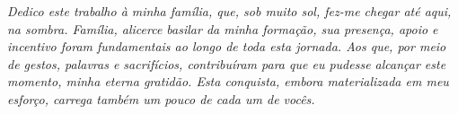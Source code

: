 \null\vfill
\hfill\begin{minipage}{0.95\textwidth}
\textit{Dedico este trabalho à minha família, que, sob muito sol, fez-me chegar até aqui, na sombra. Família, alicerce basilar da minha formação, sua presença, apoio e incentivo foram fundamentais ao longo de toda esta jornada. Aos que, por meio de gestos, palavras e sacrifícios, contribuíram para que eu pudesse alcançar este momento, minha eterna gratidão. Esta conquista, embora materializada em meu esforço, carrega também um pouco de cada um de vocês.}
\end{minipage}
\vspace{1cm}
